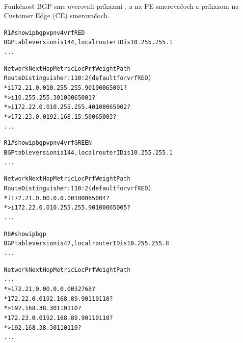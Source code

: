 \documentclass[12pt,twoside,a4paper]{report}
\begin{document}
\paragraph{}
Funkčnosť BGP sme overovali príkazmi ,  a  na PE smerovačoch a príkazom  na Customer Edge (CE) smerovačoch.

\noindent
{\selectfont
\begin{small}
\begin{alltt}
R1#show ip bgp vpnv4 vrf RED
BGP table version is 144, local router ID is 10.255.255.1
...

     Network          Next Hop            Metric LocPrf Weight Path
Route Distinguisher: 110:2 (default for vrf RED)
 * i 172.21.0.0       10.255.255.9             0    100      0 65001 ?
 *>i                  10.255.255.3             0    100      0 65001 ?
 *>i 172.22.0.0       10.255.255.4             0    100      0 65002 ?
 *>  172.23.0.0       192.168.15.5             0             0 65003 ?
...





R1#show ip bgp vpnv4 vrf GREEN
BGP table version is 144, local router ID is 10.255.255.1
...

     Network          Next Hop            Metric LocPrf Weight Path
Route Distinguisher: 110:2 (default for vrf RED)
 * i 172.21.0.0       0.0.0.0                  0    100      0 65004 ?
 *>i 172.22.0.0       10.255.255.9             0    100      0 65005 ?
...




R8#show ip bgp
BGP table version is 47, local router ID is 10.255.255.8
...

     Network          Next Hop            Metric LocPrf Weight Path
...
 *>  172.21.0.0       0.0.0.0                  0         32768 ?
 *   172.22.0.0       192.168.89.9                           0 110 110 ?
 *>                   192.168.38.3                           0 110 110 ?
 *   172.23.0.0       192.168.89.9                           0 110 110 ?
 *>                   192.168.38.3                           0 110 110 ?
...





\end{alltt}
\end{small}}
\end{document}
